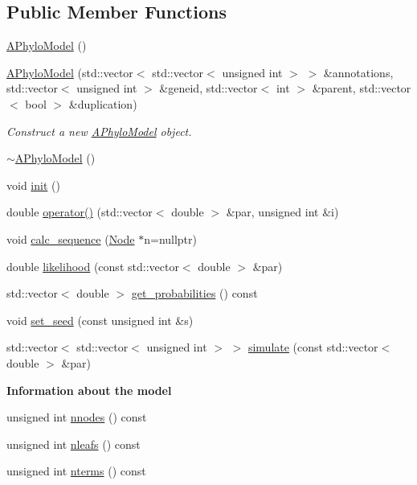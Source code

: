 \subsection*{Public Member Functions}
\begin{DoxyCompactItemize}
\item 
\hyperlink{class_a_phylo_model_a5055699d05235bbefb283298d9dee75d}{A\+Phylo\+Model} ()
\item 
\hyperlink{class_a_phylo_model_a4c0005c106a12f1b11ccd9f5ceac8d9c}{A\+Phylo\+Model} (std\+::vector$<$ std\+::vector$<$ unsigned int $>$ $>$ \&annotations, std\+::vector$<$ unsigned int $>$ \&geneid, std\+::vector$<$ int $>$ \&parent, std\+::vector$<$ bool $>$ \&duplication)
\begin{DoxyCompactList}\small\item\em Construct a new \hyperlink{class_a_phylo_model}{A\+Phylo\+Model} object. \end{DoxyCompactList}\item 
\hyperlink{class_a_phylo_model_ab8b8523e07df92859e5d4289341da72f}{$\sim$\+A\+Phylo\+Model} ()
\item 
void \hyperlink{class_a_phylo_model_a45a7af583f9619bce5d88b15303a73e6}{init} ()
\item 
double \hyperlink{class_a_phylo_model_a9b3390c29ea7a3283e68e9a059b94138}{operator()} (std\+::vector$<$ double $>$ \&par, unsigned int \&i)
\item 
void \hyperlink{class_a_phylo_model_a4a06f02ecd5da1e1b5609fec24318282}{calc\+\_\+sequence} (\hyperlink{class_node}{Node} $\ast$n=nullptr)
\item 
double \hyperlink{class_a_phylo_model_a66fced3b89fe385862318621855fa605}{likelihood} (const std\+::vector$<$ double $>$ \&par)
\item 
std\+::vector$<$ double $>$ \hyperlink{class_a_phylo_model_a3368d03919454f68f0cb5bd888f983a1}{get\+\_\+probabilities} () const
\item 
void \hyperlink{class_a_phylo_model_a5f3faed4bad372764c056d1686508d6e}{set\+\_\+seed} (const unsigned int \&s)
\item 
std\+::vector$<$ std\+::vector$<$ unsigned int $>$ $>$ \hyperlink{class_a_phylo_model_ac75bb5a2f14d104733e2c194ae210986}{simulate} (const std\+::vector$<$ double $>$ \&par)
\end{DoxyCompactItemize}
\begin{Indent}\textbf{ Information about the model}\par
\begin{DoxyCompactItemize}
\item 
unsigned int \hyperlink{class_a_phylo_model_a5a13086298e421d18ed60e6ecfced009}{nnodes} () const
\item 
unsigned int \hyperlink{class_a_phylo_model_adfb761d08367323cd94e917a5249bd86}{nleafs} () const
\item 
unsigned int \hyperlink{class_a_phylo_model_ada9ba3e2df8586216573fa27566d92cb}{nterms} () const
\end{DoxyCompactItemize}
\end{Indent}
